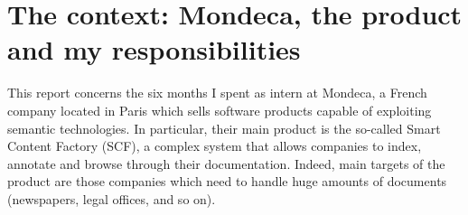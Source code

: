 \documentclass[12pt,svgnames]{memoir}
\author{}
\date{}
\let\OldTexttt\texttt
\renewcommand{\texttt}[1]{\OldTexttt{\hl{#1}}}
\begin{document}

\addtocounter{page}{-1} %
\null
\thispagestyle{empty}%
\addtocounter{page}{-1}%
\newpage



{
\hypersetup{linkcolor=black}
\setcounter{tocdepth}{2}
\tableofcontents
}
\chapter{The context: Mondeca, the product and my
responsibilities}\label{the-context-mondeca-the-product-and-my-responsibilities}

This report concerns the six months I spent as intern at Mondeca, a
French company located in Paris which sells software products capable of
exploiting semantic technologies. In particular, their main product is
the so-called Smart Content Factory (SCF), a complex system that allows
companies to index, annotate and browse through their documentation.
Indeed, main targets of the product are those companies which need to
handle huge amounts of documents (newspapers, legal offices, and so on).
\end{document}
